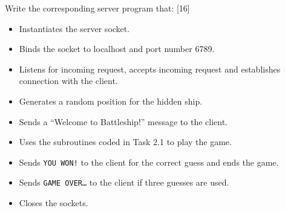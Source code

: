 Write the corresponding server program that: \hfill{}{[}16{]}
\begin{itemize}
\item Instantiates the server socket. 
\item Binds the socket to localhost and port number 6789. 
\item Listens for incoming request, accepts incoming request and establishes
connection with the client. 
\item Generates a random position for the hidden ship. 
\item Sends a \textquotedblleft Welcome to Battleship!\textquotedblright{}
message to the client. 
\item Uses the subroutines coded in Task 2.1 to play the game. 
\item Sends \textquotedbl\texttt{YOU WON!}\textquotedbl{} to the client
for the correct guess and ends the game. 
\item Sends \textquotedbl\texttt{GAME OVER\dots }\textquotedbl{} to the
client if three guesses are used. 
\item Closes the sockets.
\end{itemize}